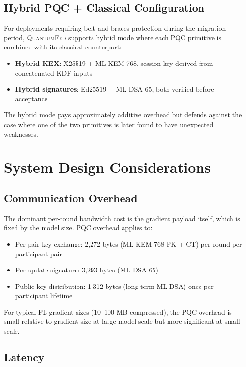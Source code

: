 \documentclass[sigconf,nonacm]{acmart}
\begin{document}
\subsection{Hybrid PQC + Classical Configuration}

For deployments requiring belt-and-braces protection during the
migration period, \textsc{QuantumFed} supports hybrid mode where
each PQC primitive is combined with its classical counterpart:

\begin{itemize}
  \item \textbf{Hybrid KEX}: X25519 + ML-KEM-768, session key
        derived from concatenated KDF inputs
  \item \textbf{Hybrid signatures}: Ed25519 + ML-DSA-65, both
        verified before acceptance
\end{itemize}

The hybrid mode pays approximately additive overhead but defends
against the case where one of the two primitives is later found
to have unexpected weaknesses.

\section{System Design Considerations}

\subsection{Communication Overhead}

The dominant per-round bandwidth cost is the gradient payload
itself, which is fixed by the model size. PQC overhead applies to:

\begin{itemize}
  \item Per-pair key exchange: 2{,}272 bytes (ML-KEM-768 PK + CT)
        per round per participant pair
  \item Per-update signature: 3{,}293 bytes (ML-DSA-65)
  \item Public key distribution: 1{,}312 bytes (long-term ML-DSA)
        once per participant lifetime
\end{itemize}

For typical FL gradient sizes (10--100 MB compressed), the PQC
overhead is small relative to gradient size at large model scale
but more significant at small scale.

\subsection{Latency}
\end{document}

